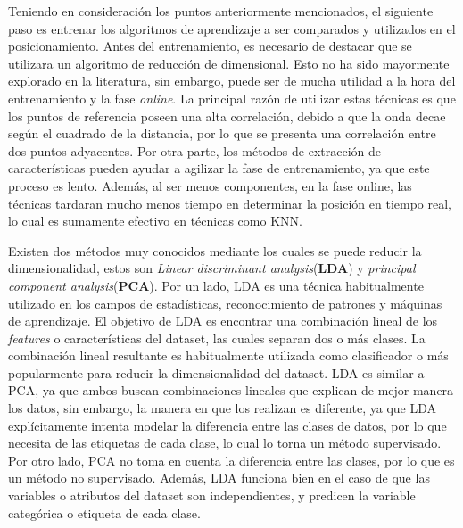 Teniendo en consideración los puntos anteriormente mencionados, el siguiente paso es entrenar los algoritmos de aprendizaje a ser comparados y utilizados en el posicionamiento. Antes del entrenamiento, es necesario de destacar que se utilizara un algoritmo de reducción de dimensional. Esto no ha sido mayormente explorado en la literatura, sin embargo, puede ser de mucha utilidad a la hora del entrenamiento y la fase \textit{online}. La principal razón de utilizar estas técnicas es que los puntos de referencia poseen una alta correlación, debido a que la onda decae según el cuadrado de la distancia, por lo que se presenta una correlación entre dos puntos adyacentes. Por otra parte, los métodos de extracción de características pueden ayudar a agilizar la fase de entrenamiento, ya que este proceso es lento. Además, al ser menos componentes, en la fase online, las técnicas tardaran mucho menos tiempo en determinar la posición en tiempo real, lo cual es sumamente efectivo en técnicas como KNN.

Existen dos métodos muy conocidos mediante los cuales se puede reducir la dimensionalidad, estos son \textit{Linear discriminant analysis}(\textbf{LDA}) y \textit{principal component analysis}(\textbf{PCA}). Por un lado, LDA es una técnica habitualmente utilizado en los campos de estadísticas, reconocimiento de patrones y máquinas de aprendizaje. El objetivo de LDA es encontrar una combinación lineal de los \textit{features} o características del dataset, las cuales separan dos o más clases. La combinación lineal resultante es habitualmente utilizada como clasificador o más popularmente para reducir la dimensionalidad del dataset. LDA es similar a PCA, ya que ambos buscan combinaciones lineales que explican de mejor manera los datos, sin embargo, la manera en que los realizan es diferente, ya que LDA explícitamente intenta modelar la diferencia entre las clases de datos, por lo que necesita de las etiquetas de cada clase, lo cual lo torna un método supervisado. Por otro lado, PCA no toma en cuenta la diferencia entre las clases, por lo que es un método no supervisado. Además, LDA funciona bien en el caso de que las variables o atributos del dataset son independientes, y predicen la variable categórica o etiqueta de cada clase.

